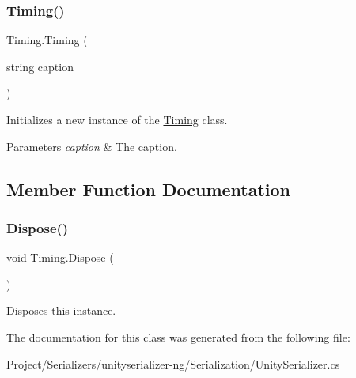 \subsubsection{\texorpdfstring{Timing()}{Timing()}}
{\footnotesize\ttfamily Timing.\+Timing (\begin{DoxyParamCaption}\item[{string}]{caption }\end{DoxyParamCaption})\hspace{0.3cm}{\ttfamily [inline]}}



Initializes a new instance of the \hyperlink{class_timing}{Timing} class. 


\begin{DoxyParams}{Parameters}
{\em caption} & The caption.\\
\hline
\end{DoxyParams}


\subsection{Member Function Documentation}
\mbox{\label{class_timing_a955a1d9e65579124a6ba9da8a47bc2f8}} 
\subsubsection{\texorpdfstring{Dispose()}{Dispose()}}
{\footnotesize\ttfamily void Timing.\+Dispose (\begin{DoxyParamCaption}{ }\end{DoxyParamCaption})\hspace{0.3cm}{\ttfamily [inline]}}



Disposes this instance. 



The documentation for this class was generated from the following file\+:\begin{DoxyCompactItemize}
\item 
Project/\+Serializers/unityserializer-\/ng/\+Serialization/Unity\+Serializer.\+cs\end{DoxyCompactItemize}
